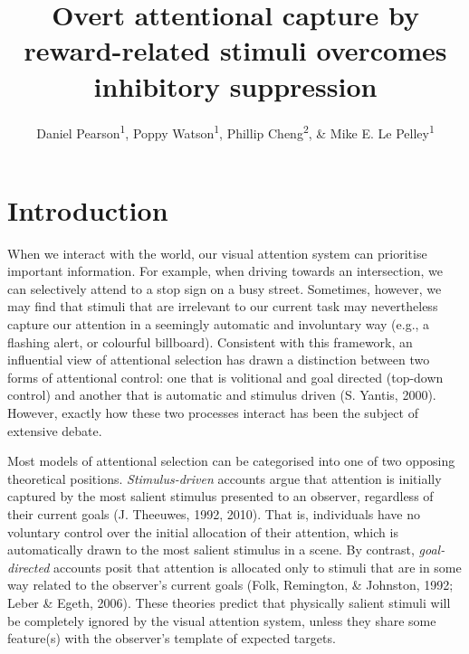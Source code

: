 \documentclass[jou, a4paper, noextraspace,floatsintext]{apa6}
\title{Overt attentional capture by reward-related stimuli overcomes inhibitory
suppression}
\author{Daniel Pearson\textsuperscript{1}, Poppy Watson\textsuperscript{1},
Phillip Cheng\textsuperscript{2}, \& Mike E. Le
Pelley\textsuperscript{1}}
\date{}
\affiliation{
\vspace{0.5cm}
\textsuperscript{1} School of Psychology, UNSW Sydney\\\textsuperscript{2} Department of Psychology, Macquarie University}
\theoremstyle{definition}
\theoremstyle{definition}
\theoremstyle{definition}
\theoremstyle{remark}
\begin{document}
\maketitle

\section{Introduction}\label{introduction}

When we interact with the world, our visual attention system can
prioritise important information. For example, when driving towards an
intersection, we can selectively attend to a stop sign on a busy street.
Sometimes, however, we may find that stimuli that are irrelevant to our
current task may nevertheless capture our attention in a seemingly
automatic and involuntary way (e.g., a flashing alert, or colourful
billboard). Consistent with this framework, an influential view of
attentional selection has drawn a distinction between two forms of
attentional control: one that is volitional and goal directed (top-down
control) and another that is automatic and stimulus driven (S. Yantis,
2000). However, exactly how these two processes interact has been the
subject of extensive debate.

Most models of attentional selection can be categorised into one of two
opposing theoretical positions. \emph{Stimulus-driven} accounts argue
that attention is initially captured by the most salient stimulus
presented to an observer, regardless of their current goals (J.
Theeuwes, 1992, 2010). That is, individuals have no voluntary control
over the initial allocation of their attention, which is automatically
drawn to the most salient stimulus in a scene. By contrast,
\emph{goal-directed} accounts posit that attention is allocated only to
stimuli that are in some way related to the observer's current goals
(Folk, Remington, \& Johnston, 1992; Leber \& Egeth, 2006). These
theories predict that physically salient stimuli will be completely
ignored by the visual attention system, unless they share some
feature(s) with the observer's template of expected targets.
\end{document}

